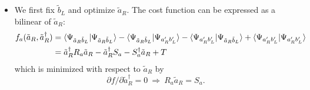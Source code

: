 \documentclass[11pt]{article}
\begin{document}
\begin{itemize}
    \item We first fix $\tilde{b}_L$ and optimize $\tilde{a}_R$. The cost function can be expressed as a bilinear of $\tilde{a}_R$:
    \begin{align}
        f_a(\tilde{a}_R, \tilde{a}^\dagger_R)
        &= \braket{\Psi_{\tilde{a}_R \tilde{b}_L} | \Psi_{\tilde{a}_R \tilde{b}_L}}
        - \braket{\Psi_{\tilde{a}_R \tilde{b}_L} | \Psi_{a'_R b'_L}}
        - \braket{\Psi_{a'_R b'_L} | \Psi_{\tilde{a}_R \tilde{b}_L}}
        + \braket{\Psi_{a'_R b'_L} | \Psi_{a'_R b'_L}}
        \nonumber \\
        &= \tilde{a}^\dagger_R R_a \tilde{a}_R
        - \tilde{a}^\dagger_R S_a
        - S^\dagger_a \tilde{a}_R + T
    \end{align}
    which is minimized with respect to $\tilde{a}_R$ by
    \begin{equation}
        \partial f / \partial \tilde{a}^\dagger_R = 0
        \ \Rightarrow \ 
        R_a \tilde{a}_R = S_a. 
    \end{equation}


\end{itemize}
\end{document}

